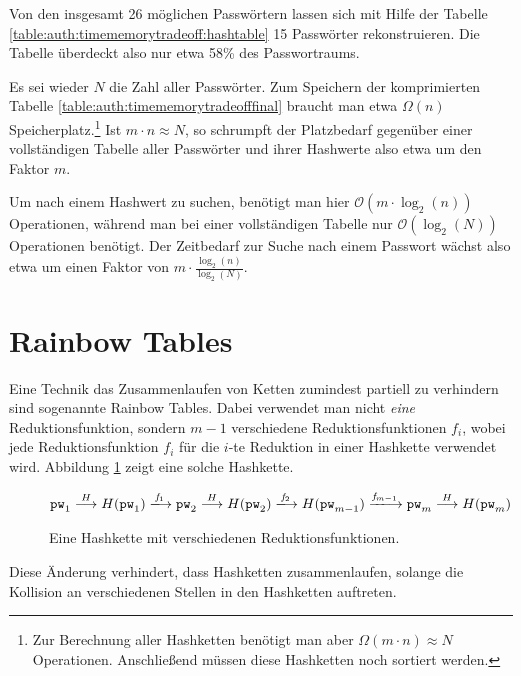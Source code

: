 Von den insgesamt 26 möglichen Passwörtern lassen sich mit Hilfe der
Tabelle \ref{table:auth:timememorytradeoff:hashtable} 15 Passwörter
rekonstruieren. Die Tabelle überdeckt also nur etwa 58\% des
Passwortraums.

Es sei wieder $N$ die Zahl aller Passwörter. Zum Speichern der
komprimierten Tabelle \ref{table:auth:timememorytradeofffinal} braucht
man etwa $\Omega(n)$ Speicherplatz.\footnote{Zur Berechnung aller
Hashketten benötigt man aber $\Omega(m \cdot n) \approx N$
Operationen. Anschließend müssen diese Hashketten noch sortiert werden.}
Ist $m \cdot n \approx N$, so schrumpft der Platzbedarf gegenüber einer
vollständigen Tabelle aller Passwörter und ihrer Hashwerte also etwa um
den Faktor $m$.

Um nach einem Hashwert zu suchen, benötigt man hier $\mathcal{O}(m \cdot
\log_2(n))$ Operationen, während man bei einer vollständigen Tabelle nur
$\mathcal{O}(\log_2(N))$ Operationen benötigt. Der Zeitbedarf zur Suche
nach einem Passwort wächst also etwa um einen Faktor von $m \cdot
\frac{\log_2(n)}{\log_2(N)}$.

\section{Rainbow Tables}

Eine Technik das Zusammenlaufen von Ketten zumindest partiell zu
verhindern sind sogenannte Rainbow Tables. Dabei verwendet man nicht
\emph{eine} Reduktionsfunktion, sondern $m-1$ verschiedene
Reduktionsfunktionen $f_i$, wobei jede Reduktionsfunktion $f_i$ für die
$i$-te Reduktion in einer Hashkette verwendet wird. Abbildung
\ref{fig:auth:rainbowhashchain} zeigt eine solche Hashkette.

\begin{figure}[h]
	\begin{equation*} \pw_1 \hasharrow H(\pw_1) \VRTF[1] \pw_2
\hasharrow H(\pw_2) \VRTF[2] %
H(\pw_{m-1}) \VRTF[m-1] \pw_m \hasharrow H(\pw_m)
	\end{equation*}
	\caption{Eine Hashkette mit verschiedenen Reduktionsfunktionen.}
	\label{fig:auth:rainbowhashchain}
\end{figure}

Diese Änderung verhindert, dass Hashketten zusammenlaufen, solange die
Kollision an verschiedenen Stellen in den Hashketten auftreten.

